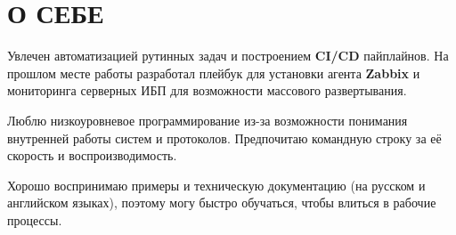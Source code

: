 \section{О СЕБЕ}

Увлечен автоматизацией рутинных задач и построением \textbf{CI/CD}
пайплайнов. На прошлом месте работы разработал плейбук для установки
агента \textbf{Zabbix} и мониторинга серверных ИБП для возможности
массового развертывания.

Люблю низкоуровневое программирование из-за возможности понимания
внутренней работы систем и протоколов. Предпочитаю командную строку за
её скорость и воспроизводимость.

Хорошо воспринимаю примеры и техническую документацию (на русском и
английском языках), поэтому могу быстро обучаться, чтобы влиться в
рабочие процессы.

